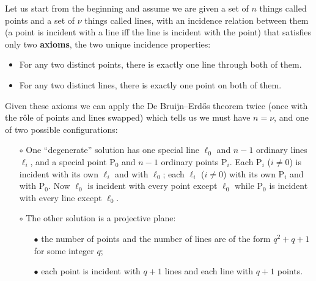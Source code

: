 \documentclass[12pt]{article}
\begin{document}
Let us start from the beginning and assume we are given a set of $n$ things called {\sc point}s and a set of $\nu$ things called {\sc line}s, with an
incidence relation between them (a {\sc point} is incident with a {\sc line} iff the {\sc line} is incident with the {\sc point}) that satisfies only two {\bf axioms}, the two unique incidence properties:
%
\begin{itemize}

\item For any two distinct {\sc point}s,
      there is exactly one {\sc line} through both of them.

\item For any two distinct {\sc line}s,
      there is exactly one {\sc point} on both of them.

\end{itemize}
%
Given these  axioms we can apply the De Bruijn--Erd\H{o}s theorem twice (once with the r\^ole of {\sc point}s and {\sc line}s swapped) which tells us we must have $n=\nu$, and one of two possible configurations:
%
\begin{itemize}

\item[$\circ$] One ``degenerate'' solution has one special line
               $\ell_0$ and $n-1$ ordinary lines $\ell_i$, and a special point
               P$_0$ and $n-1$ ordinary points P$_i$. Each P$_i$ ($i\ne0$) is
               incident with its own $\ell_i$ and with $\ell_0$; each $\ell_i$
               ($i\ne0$) with its own P$_i$ and with P$_0$. Now $\ell_0$ is
               incident with every point except $\ell_0$ while P$_0$ is
               incident with every line except $\ell_0$.

\item[$\circ$] The other solution is a projective plane:

               \begin{itemize}

               \item[$\bullet$] the number of {\sc point}s and the number of
                    {\sc line}s are of the form $q^2+q+1$ for some integer $q$;

               \item[$\bullet$] each {\sc point} is incident with $q+1$
                    {\sc line}s and each {\sc line} with $q+1$ {\sc point}s.

               \end{itemize}

\end{itemize}
\end{document}
